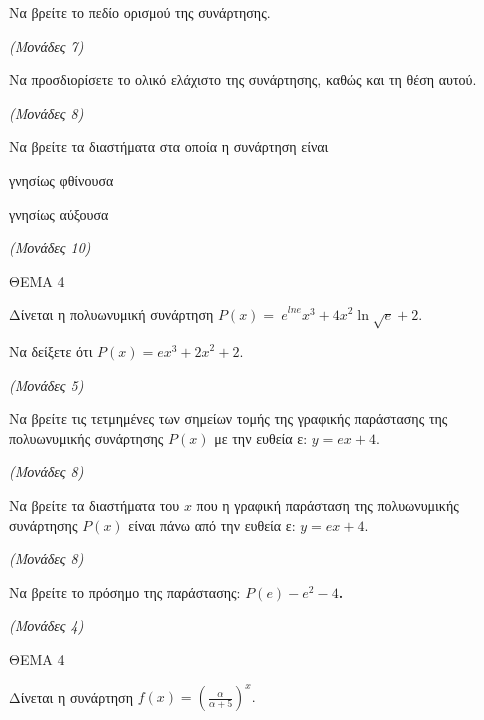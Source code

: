 \documentclass[11pt,a4paper,twoside]{book}
\newcommand{\monades}[1]{\hfill \textit{(Μονάδες #1)}}
\begin{document}
\begin{alist}
\item Να βρείτε το πεδίο ορισμού της συνάρτησης.

\monades{7}

\item Να προσδιορίσετε το ολικό ελάχιστο της συνάρτησης, καθώς και τη θέση αυτού.

\monades{8}

\item Να βρείτε τα διαστήματα στα οποία η συνάρτηση είναι

\begin{rlist}
\item γνησίως φθίνουσα
\item γνησίως αύξουσα
\end{rlist}

\monades{10}
\end{alist}

\vspace{4mm}

ΘΕΜΑ 4

Δίνεται η πολυωνυμική συνάρτηση ${P(x) = \ e}^{lne}x^{3} + {4x}^{2}\ln\sqrt{e} + 2$.

\begin{alist}
\item Να δείξετε ότι $P(x) = ex^{3} + {2x}^{2} + 2$.

\monades{5}

\item Να βρείτε τις τετμημένες των σημείων τομής της γραφικής παράστασης της πολυωνυμικής συνάρτησης $P(x)$ με την ευθεία ε: $y = ex + 4$.

\monades{8}

\item Να βρείτε τα διαστήματα του $x$ που η γραφική παράσταση της πολυωνυμικής συνάρτησης $P(x)$ είναι πάνω από την ευθεία ε: $y = ex + 4$.

\monades{8}

\item Να βρείτε το πρόσημο της παράστασης: $P(e) - e^{2} - 4$\textbf{.}

\monades{4}
\end{alist}

\vspace{4mm}

ΘΕΜΑ 4

Δίνεται η συνάρτηση $f(x) = \left( \frac{\alpha}{\alpha + 5} \right)^{x}.$
\end{document}
